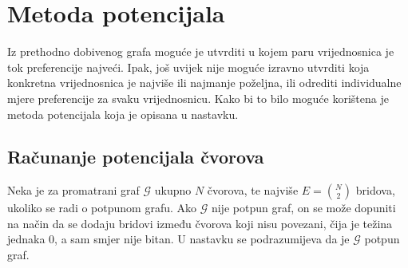 \documentclass[lmodern, utf8, diplomski, numeric]{fer}
\newcommand{\graph}[1]{\mathcal{#1}}
\begin{document}
  

  \section{Metoda potencijala}
  \label{sec:metpot}
  Iz prethodno dobivenog grafa moguće je utvrditi u kojem paru vrijednosnica je tok preferencije najveći.
  Ipak, još uvijek nije moguće izravno utvrditi koja konkretna vrijednosnica je najviše ili najmanje poželjna, ili odrediti individualne mjere preferencije za svaku vrijednosnicu.
  Kako bi to bilo moguće korištena je metoda potencijala koja je opisana u nastavku.
  
  
  \subsection{Računanje potencijala čvorova}
  \label{sub:potential}
  Neka je za promatrani graf $\graph{G}$ ukupno $N$ čvorova, te najviše $E = \binom{N}{2}$ bridova, ukoliko se radi o potpunom grafu.
  Ako $\graph{G}$ nije potpun graf, on se može dopuniti na način da se dodaju bridovi između čvorova koji nisu povezani, čija je težina jednaka 0, a sam smjer nije bitan.
  U nastavku se podrazumijeva da je $\graph{G}$ potpun graf.
  
\end{document}
